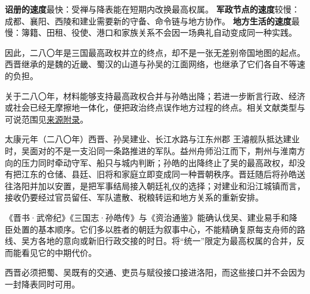 \textbf{诏册的速度}最快：受禅与降表能在短期内改换最高权属。
\textbf{军政节点的速度}较慢：成都、襄阳、西陵和建业需要新的守备、命令链与地方协作。
\textbf{地方生活的速度}最慢：簿籍、田租、役使、港口和家族关系不会因一场典礼自动变成同一种实践。

因此，二八〇年是三国最高政权并立的终点，却不是一张无差别帝国地图的起点。西晋继承的是魏的近畿、蜀汉的山道与孙吴的江面网络，也继承了它们各自不等速的负担。

\begin{debate}[“统一”的边界]
关于二八〇年，材料能够支持最高政权合并与孙皓出降；若进一步断言行政、经济或社会已经无摩擦地一体化，便把政治终点误作地方过程的终点。相关文献类型与可说范围见\hyperref[app:sources]{来源附录}。
\end{debate}

\begin{event}{}{太康元年（二八〇年）}{西晋、孙吴}{建业、长江水路与江东州郡}
王濬舰队抵达建业时，吴面对的不是一支沿同一条路推进的军队。益州舟师沿江而下，荆州与淮南方向的压力同时牵动守军、船只与城内判断；孙皓的出降终止了吴的最高政权，却没有把江东的仓储、县廷、旧将和家庭立即变成同一种晋朝秩序。晋廷随后将孙皓送往洛阳并加以安置，是把军事结局接入朝廷礼仪的选择；对建业和沿江城镇而言，接收仍要经过官员留任、军队遣散、税粮转运和地方关系的重新安排。

\begin{sourcenote}[降表不能替江东各地说话]
《晋书·武帝纪》《三国志·孙皓传》与《资治通鉴》能确认伐吴、建业易手和降臣处置的基本顺序。它们多以胜者的朝廷为叙事中心，不能精确复原每支舟师的路线、吴方各地的意向或新旧行政交接的时日。将“统一”限定为最高权属的合并，反而能看见它的中期代价。
\end{sourcenote}
西晋必须把蜀、吴既有的交通、吏员与赋役接口接进洛阳，而这些接口并不会因为一封降表同时可用。
\end{event}


